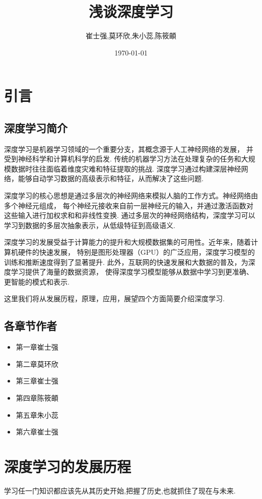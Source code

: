 \documentclass[UTF8]{ctexbook}
\title{浅谈深度学习}
\author{崔士强,莫环欣,朱小蕊,陈筱頔}
\date{\today}
\begin{document}
\maketitle
\tableofcontents

\chapter{引言}
\section{深度学习简介}
深度学习是机器学习领域的一个重要分支，其概念源于人工神经网络的发展，
并受到神经科学和计算机科学的启发.
传统的机器学习方法在处理复杂的任务和大规模数据时往往面临着维度灾难和特征提取的挑战.
深度学习通过构建深层神经网络，能够自动学习数据的高级表示和特征，从而解决了这些问题.

深度学习的核心思想是通过多层次的神经网络来模拟人脑的工作方式。神经网络由多个神经元组成，
每个神经元接收来自前一层神经元的输入，并通过激活函数对这些输入进行加权求和和非线性变换.
通过多层次的神经网络结构，深度学习可以学习到数据的多层次抽象表示，从低级特征到高级语义.

深度学习的发展受益于计算能力的提升和大规模数据集的可用性。近年来，随着计算机硬件的快速发展，
特别是图形处理器（GPU）的广泛应用，深度学习模型的训练和推断速度得到了显著提升.
此外，互联网的快速发展和大数据的普及，为深度学习提供了海量的数据资源，
使得深度学习模型能够从数据中学习到更准确、更智能的模式和表示.

这里我们将从发展历程，原理，应用，展望四个方面简要介绍深度学习.
\section{各章节作者}
\begin{itemize}
    \item 第一章\qquad 崔士强
    \item 第二章\qquad 莫环欣
    \item 第三章\qquad 崔士强
    \item 第四章\qquad 陈筱頔
    \item 第五章\qquad 朱小蕊
    \item 第六章\qquad 崔士强
\end{itemize}

\let\cleardoublepage\clearpage
\chapter{深度学习的发展历程}
学习任一门知识都应该先从其历史开始,把握了历史,也就抓住了现在与未来.
\end{document}
